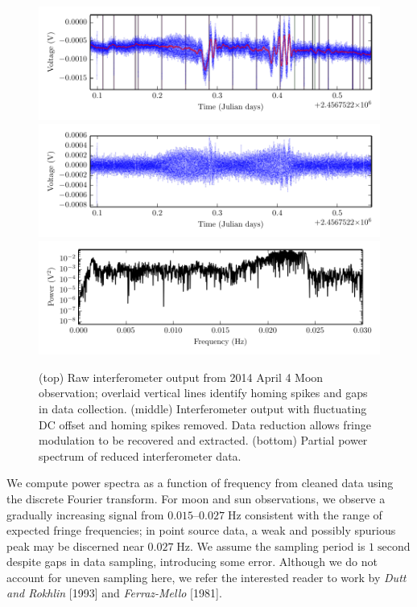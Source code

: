 \documentclass[10pt]{article}
\newcommand {\mt}{\mathrm}
\newcommand {\unit}[1]{\; \mt{#1}}
\begin{document}
\begin{figure}[!ht]
    \centering
    \includegraphics{plots/moon_raw.pdf} \\
    \includegraphics{plots/moon_clean.pdf} \\
    \includegraphics{plots/moon_fft.pdf} \\
    \caption{(top) Raw interferometer output from 2014 April 4 Moon observation; overlaid vertical lines identify homing spikes and gaps in data collection. (middle) Interferometer output with fluctuating DC offset and homing spikes removed.  Data reduction allows fringe modulation to be recovered and extracted.  (bottom) Partial power spectrum of reduced interferometer data.}
    \label{fig:reduction}
\end{figure}

We compute power spectra as a function of frequency from cleaned data using the discrete Fourier transform.  For moon and sun observations, we observe a gradually increasing signal from $0.015$--$0.027 \unit{Hz}$ consistent with the range of expected fringe frequencies; in point source data, a weak and possibly spurious peak may be discerned near $0.027 \unit{Hz}$.  We assume the sampling period is $1 \unit{second}$ despite gaps in data sampling, introducing some error.  Although we do not account for uneven sampling here, we refer the interested reader to work by \textit{Dutt and Rokhlin} [1993] and \textit{Ferraz-Mello} [1981].
\end{document}
